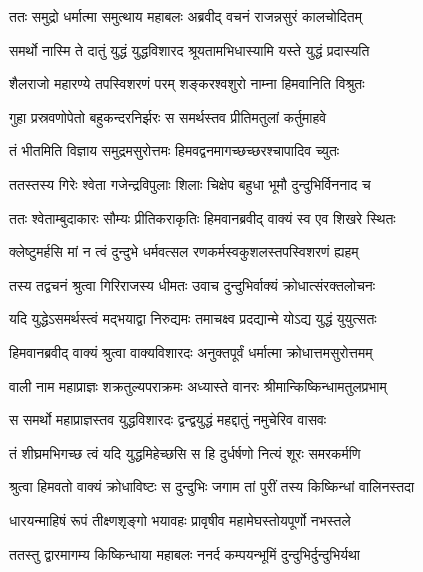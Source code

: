 \twolineshloka
{ततः समुद्रो धर्मात्मा समुत्थाय महाबलः}
{अब्रवीद् वचनं राजन्नसुरं कालचोदितम्} %

\twolineshloka
{समर्थो नास्मि ते दातुं युद्धं युद्धविशारद}
{श्रूयतामभिधास्यामि यस्ते युद्धं प्रदास्यति} %

\twolineshloka
{शैलराजो महारण्ये तपस्विशरणं परम्}
{शङ्करश्वशुरो नाम्ना हिमवानिति विश्रुतः} %

\twolineshloka
{गुहा प्रस्रवणोपेतो बहुकन्दरनिर्झरः}
{स समर्थस्तव प्रीतिमतुलां कर्तुमाहवे} %

\twolineshloka
{तं भीतमिति विज्ञाय समुद्रमसुरोत्तमः}
{हिमवद्वनमागच्छच्छरश्चापादिव च्युतः} %

\twolineshloka
{ततस्तस्य गिरेः श्वेता गजेन्द्रविपुलाः शिलाः}
{चिक्षेप बहुधा भूमौ दुन्दुभिर्विननाद च} %

\twolineshloka
{ततः श्वेताम्बुदाकारः सौम्यः प्रीतिकराकृतिः}
{हिमवानब्रवीद् वाक्यं स्व एव शिखरे स्थितः} %

\twolineshloka
{क्लेष्टुमर्हसि मां न त्वं दुन्दुभे धर्मवत्सल}
{रणकर्मस्वकुशलस्तपस्विशरणं ह्यहम्} %

\twolineshloka
{तस्य तद्वचनं श्रुत्वा गिरिराजस्य धीमतः}
{उवाच दुन्दुभिर्वाक्यं क्रोधात्संरक्तलोचनः} %

\twolineshloka
{यदि युद्धेऽसमर्थस्त्वं मद्भयाद्वा निरुद्यमः}
{तमाचक्ष्व प्रदद्यान्मे योऽद्य युद्धं युयुत्सतः} %

\twolineshloka
{हिमवानब्रवीद् वाक्यं श्रुत्वा वाक्यविशारदः}
{अनुक्तपूर्वं धर्मात्मा क्रोधात्तमसुरोत्तमम्} %

\twolineshloka
{वाली नाम महाप्राज्ञः शक्रतुल्यपराक्रमः}
{अध्यास्ते वानरः श्रीमान्किष्किन्धामतुलप्रभाम्} %

\twolineshloka
{स समर्थो महाप्राज्ञस्तव युद्धविशारदः}
{द्वन्द्वयुद्धं महद्दातुं नमुचेरिव वासवः} %

\twolineshloka
{तं शीघ्रमभिगच्छ त्वं यदि युद्धमिहेच्छसि}
{स हि दुर्धर्षणो नित्यं शूरः समरकर्मणि} %

\twolineshloka
{श्रुत्वा हिमवतो वाक्यं क्रोधाविष्टः स दुन्दुभिः}
{जगाम तां पुरीं तस्य किष्किन्धां वालिनस्तदा} %

\twolineshloka
{धारयन्माहिषं रूपं तीक्ष्णशृङ्गो भयावहः}
{प्रावृषीव महामेघस्तोयपूर्णो नभस्तले} %

\twolineshloka
{ततस्तु द्वारमागम्य किष्किन्धाया महाबलः}
{ननर्द कम्पयन्भूमिं दुन्दुभिर्दुन्दुभिर्यथा} %

